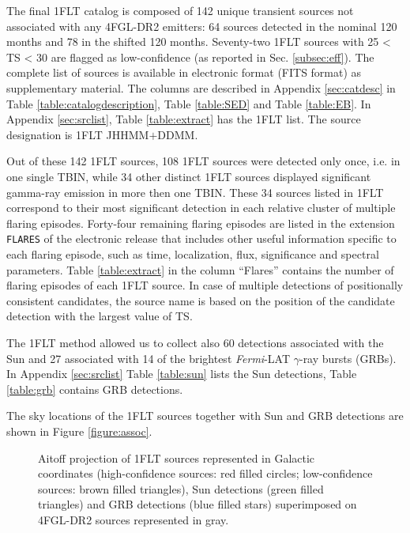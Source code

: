 \documentclass{aastex62}
\newcommand\fermilat{{\it Fermi}-LAT }
\begin{document}
The final 1FLT catalog is composed of 142 unique transient sources not associated with any 4FGL-DR2 emitters: 64 sources detected in the nominal 120 months and 78 in the shifted 120 months. Seventy-two 1FLT sources with 25 < TS < 30 are flagged as low-confidence (as reported in Sec. \ref{subsec:eff}).
The complete list of sources is available in electronic format (FITS format) as supplementary material. The columns are described in Appendix \ref{sec:catdesc} in Table \ref{table:catalogdescription}, Table \ref{table:SED} and Table \ref{table:EB}. In Appendix \ref{sec:srclist}, Table \ref{table:extract} has the 1FLT list. The source designation is 1FLT JHHMM$+$DDMM.

Out of these 142 1FLT sources, 108 1FLT sources were detected only once, i.e. in one single TBIN, while 34 other distinct 1FLT sources displayed significant gamma-ray emission in more then one TBIN.
These 34 sources listed in 1FLT correspond to their most significant detection in each relative cluster of multiple flaring episodes. 
Forty-four remaining flaring episodes are listed in the extension \texttt{FLARES} of the electronic release that includes other useful information specific to each flaring episode, such as time, localization, flux, significance and spectral parameters. Table \ref{table:extract} in the column ``Flares'' contains the number of flaring episodes of each 1FLT source. In case of multiple detections of positionally consistent candidates, the source name is based on the position of the candidate detection with the largest value of TS.

The 1FLT method allowed us to collect also 60 detections associated with the Sun and 27 associated with 14 of the brightest \fermilat $\gamma$-ray bursts (GRBs). In Appendix \ref{sec:srclist} Table \ref{table:sun} lists the Sun detections, Table \ref{table:grb} contains GRB detections.

The sky locations of the 1FLT sources together with Sun and GRB detections are shown in Figure \ref{figure:assoc}. 

\begin{figure}[hbt!]
 \caption{Aitoff projection of 1FLT sources represented in Galactic coordinates (high-confidence sources: red filled circles; low-confidence sources: brown filled triangles), Sun detections (green filled triangles) and GRB detections (blue filled stars) superimposed on 4FGL-DR2 sources represented in gray.} 
\end{figure}\label{figure:assoc}
\end{document}

